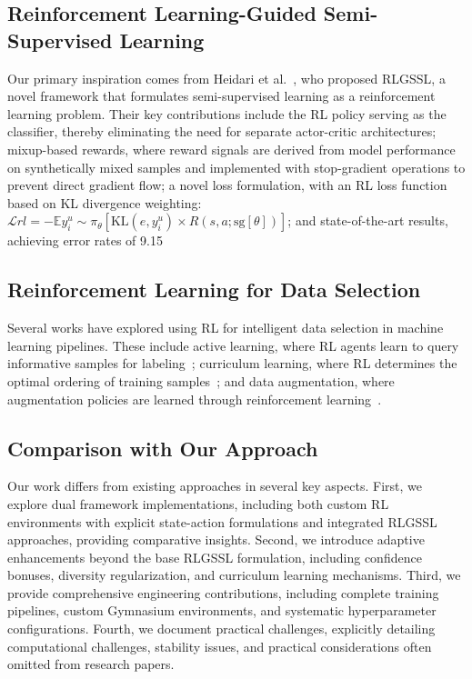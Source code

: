 \documentclass{scrartcl}
\begin{document}
\subsection{Reinforcement Learning-Guided Semi-Supervised Learning}
Our primary inspiration comes from Heidari et al.~\cite{heidari2024rlgssl}, who proposed RLGSSL, a novel framework that formulates semi-supervised learning as a reinforcement learning problem. Their key contributions include the RL policy serving as the classifier, thereby eliminating the need for separate actor-critic architectures; mixup-based rewards, where reward signals are derived from model performance on synthetically mixed samples and implemented with stop-gradient operations to prevent direct gradient flow; a novel loss formulation, with an RL loss function based on KL divergence weighting: $\mathcal{L}{rl} = -\mathbb{E}{y_i^u \sim \pi_\theta} [\text{KL}(e, y_i^u) \times R(s,a;\text{sg}[\theta])]$; and state-of-the-art results, achieving error rates of 9.15%

\subsection{Reinforcement Learning for Data Selection}
Several works have explored using RL for intelligent data selection in machine learning pipelines. These include active learning, where RL agents learn to query informative samples for labeling~\cite{fang2017learning}; curriculum learning, where RL determines the optimal ordering of training samples~\cite{narvekar2020curriculum}; and data augmentation, where augmentation policies are learned through reinforcement learning~\cite{cubuk2019autoaugment}.

\subsection{Comparison with Our Approach}
Our work differs from existing approaches in several key aspects. First, we explore dual framework implementations, including both custom RL environments with explicit state-action formulations and integrated RLGSSL approaches, providing comparative insights. Second, we introduce adaptive enhancements beyond the base RLGSSL formulation, including confidence bonuses, diversity regularization, and curriculum learning mechanisms. Third, we provide comprehensive engineering contributions, including complete training pipelines, custom Gymnasium environments, and systematic hyperparameter configurations. Fourth, we document practical challenges, explicitly detailing computational challenges, stability issues, and practical considerations often omitted from research papers.
\end{document}
